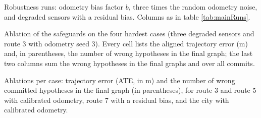 \begin{table}[htbp]
\centering
\footnotesize
\caption{Robustness runs: odometry bias factor $b$, three times the random odometry noise, and degraded sensors with a residual bias. Columns as in table \ref{tab:mainRuns}.}
\label{tab:robustness}
\resizebox{\linewidth}{!}{}
\end{table}

\begin{table}[htbp]
\centering
\footnotesize
\caption{Ablation of the safeguards on the four hardest cases (three degraded sensors and route 3 with odometry seed 3). Every cell lists the aligned trajectory error (m) and, in parentheses, the number of wrong hypotheses in the final graph; the last two columns sum the wrong hypotheses in the final graphs and over all commits.}
\label{tab:ablationHard}
\resizebox{\linewidth}{!}{}
\end{table}

\begin{table}[htbp]
\centering
\footnotesize
\caption{Ablations per case: trajectory error (ATE, in m) and the number of wrong committed hypotheses in the final graph (in parentheses), for route 3 and route 5 with calibrated odometry, route 7 with a residual bias, and the city with calibrated odometry.}
\label{tab:ablationCases}

\end{table}
